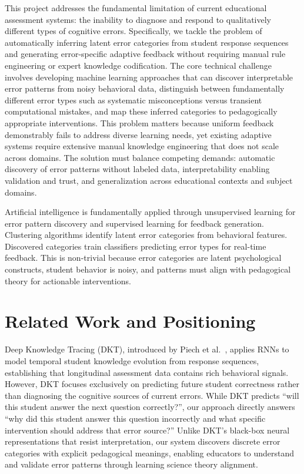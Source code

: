 \documentclass[conference]{IEEEtran}
\begin{document}
This project addresses the fundamental limitation of current educational assessment systems: the inability to diagnose and respond to qualitatively different types of cognitive errors. Specifically, we tackle the problem of automatically inferring latent error categories from student response sequences and generating error-specific adaptive feedback without requiring manual rule engineering or expert knowledge codification. The core technical challenge involves developing machine learning approaches that can discover interpretable error patterns from noisy behavioral data, distinguish between fundamentally different error types such as systematic misconceptions versus transient computational mistakes, and map these inferred categories to pedagogically appropriate interventions. This problem matters because uniform feedback demonstrably fails to address diverse learning needs, yet existing adaptive systems require extensive manual knowledge engineering that does not scale across domains. The solution must balance competing demands: automatic discovery of error patterns without labeled data, interpretability enabling validation and trust, and generalization across educational contexts and subject domains.

Artificial intelligence is fundamentally applied through unsupervised learning for error pattern discovery and supervised learning for feedback generation. Clustering algorithms identify latent error categories from behavioral features. Discovered categories train classifiers predicting error types for real-time feedback. This is non-trivial because error categories are latent psychological constructs, student behavior is noisy, and patterns must align with pedagogical theory for actionable interventions.

\section{Related Work and Positioning}

Deep Knowledge Tracing (DKT), introduced by Piech et al.~\cite{piech2015}, applies RNNs to model temporal student knowledge evolution from response sequences, establishing that longitudinal assessment data contains rich behavioral signals. However, DKT focuses exclusively on predicting future student correctness rather than diagnosing the cognitive sources of current errors. While DKT predicts ``will this student answer the next question correctly?'', our approach directly answers ``why did this student answer this question incorrectly and what specific intervention should address that error source?'' Unlike DKT's black-box neural representations that resist interpretation, our system discovers discrete error categories with explicit pedagogical meanings, enabling educators to understand and validate error patterns through learning science theory alignment.
\end{document}
